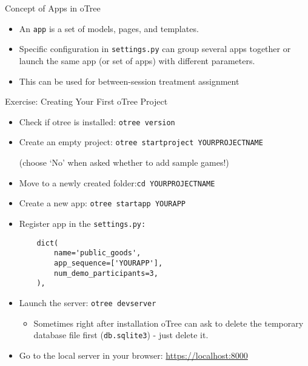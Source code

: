 \documentclass[
  ignorenonframetext,
]{beamer}
\providecommand{\tightlist}{%
  \setlength{\itemsep}{0pt}\setlength{\parskip}{0pt}}
\begin{document}
\begin{frame}[fragile]{Concept of Apps in oTree}
\label{concept-of-apps-in-otree}
\begin{itemize}
\item
  An \texttt{app} is a set of models, pages, and templates.
\item
  Specific configuration in \texttt{settings.py} can group several apps
  together or launch the same app (or set of apps) with different
  parameters.
\item
  This can be used for between-session treatment assignment
\end{itemize}
\end{frame}

\begin{frame}[fragile]{Exercise: Creating Your First oTree Project}
\label{exercise-creating-your-first-otree-project}
\small

\begin{itemize}
\item
  Check if otree is installed: \texttt{otree\ version}
\item
  Create an empty project: \texttt{otree\ startproject\ YOURPROJECTNAME}

  (choose `No' when asked whether to add sample games!)
\item
  Move to a newly created folder:\texttt{cd\ YOURPROJECTNAME}
\item
  Create a new app: \texttt{otree\ startapp\ YOURAPP}
\item
  Register app in the \texttt{settings.py:}

\begin{verbatim}
    dict(
        name='public_goods',
        app_sequence=['YOURAPP'],
        num_demo_participants=3,
    ),
\end{verbatim}
\item
  Launch the server: \texttt{otree\ devserver}

  \begin{itemize}
  \tightlist
  \item
    Sometimes right after installation oTree can ask to delete the
    temporary database file first (\texttt{db.sqlite3}) - just delete
    it.
  \end{itemize}
\item
  Go to the local server in your browser: \url{https://localhost:8000}
\end{itemize}
\end{frame}
\end{document}
